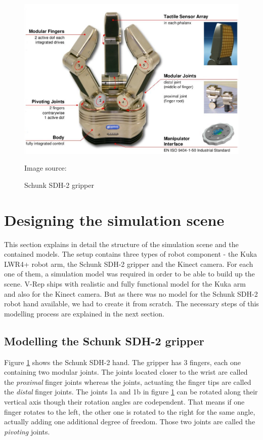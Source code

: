 \begin{figure}[ht]
	\centering
  	\includegraphics[width=1.0\textwidth]{images/sdh_sheet.jpg}
	\caption{Schunk SDH-2 gripper}
	{\scriptsize Image source: \cite{schunk2010}}
	\label{fig:sdh_sheet}
\end{figure}

\section{Designing the simulation scene}

This section explains in detail the structure of the simulation scene and the contained models. The setup contains three types of robot component - the Kuka LWR4+ robot arm, the Schunk SDH-2 gripper and the Kinect camera. For each one of them, a simulation model was required in order to be able to build up the scene. V-Rep ships with realistic and fully functional model for the Kuka arm and also for the Kinect camera. But as there was no model for the Schunk SDH-2 robot hand available, we had to create it from scratch. The necessary steps of this modelling process are explained in the next section.

\subsection{Modelling the Schunk SDH-2 gripper}

Figure \ref{fig:sdh_sheet} shows the Schunk SDH-2 hand. The gripper has 3 fingers, each one containing two modular joints. The joints located closer to the wrist are called the \emph{proximal} finger joints whereas the joints, actuating the finger tips are called the \emph{distal} finger joints. The joints 1a and 1b in figure \ref{fig:sdh_sheet} can be rotated along their vertical axis though their rotation angles are codependent. That means if one finger rotates to the left, the other one is rotated to the right for the same angle, actually adding one additional degree of freedom. Those two joints are called the \emph{pivoting} joints. \\

